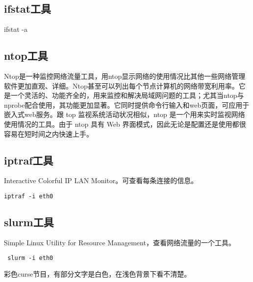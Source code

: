 \subsection{ifstat工具}
\begin{shellcmd}
ifstat -a
\end{shellcmd}

\subsection{ntop工具}
Ntop是一种监控网络流量工具，用ntop显示网络的使用情况比其他一些网络管理软件更加直观、详细。Ntop甚至可以列出每个节点计算机的网络带宽利用率。它是一个灵活的、功能齐全的，用来监控和解决局域网问题的工具；尤其当ntop与nprobe配合使用，其功能更加显著。它同时提供命令行输入和web页面，可应用于嵌入式web服务。跟 top 监视系统活动状况相似，ntop 是一个用来实时监视网络使用情况的工具。由于 ntop 具有 Web 界面模式，因此无论是配置还是使用都很容易在短时间之内快速上手。

\subsection{iptraf工具}
Interactive Colorful IP LAN Monitor。可查看每条连接的信息。
\begin{verbatim}
iptraf -i eth0
\end{verbatim}


\subsection{slurm工具}
 Simple Linux Utility for Resource Management，查看网络流量的一个工具。
 \begin{verbatim}
 slurm -i eth0
 \end{verbatim}

彩色curse节目，有部分文字是白色，在浅色背景下看不清楚。









